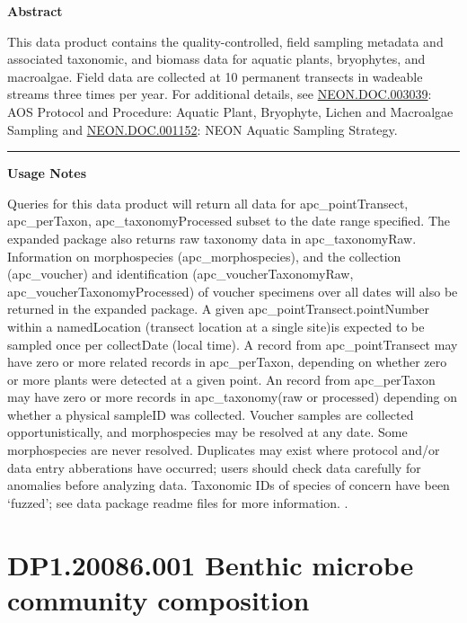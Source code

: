 \documentclass[]{article}
\begin{document}
\textbf{Abstract}

This data product contains the quality-controlled, field sampling
metadata and associated taxonomic, and biomass data for aquatic plants,
bryophytes, and macroalgae. Field data are collected at 10 permanent
transects in wadeable streams three times per year. For additional
details, see
\href{http://data.neonscience.org/api/v0/documents/NEON.DOC.003039vB}{NEON.DOC.003039}:
AOS Protocol and Procedure: Aquatic Plant, Bryophyte, Lichen and
Macroalgae Sampling and
\href{http://data.neonscience.org/api/v0/documents/NEON.DOC.001152vA}{NEON.DOC.001152}:
NEON Aquatic Sampling Strategy.

\begin{center}\rule{0.5\linewidth}{\linethickness}\end{center}

\textbf{Usage Notes}

Queries for this data product will return all data for
apc\_pointTransect, apc\_perTaxon, apc\_taxonomyProcessed subset to the
date range specified. The expanded package also returns raw taxonomy
data in apc\_taxonomyRaw. Information on morphospecies
(apc\_morphospecies), and the collection (apc\_voucher) and
identification (apc\_voucherTaxonomyRaw, apc\_voucherTaxonomyProcessed)
of voucher specimens over all dates will also be returned in the
expanded package. A given apc\_pointTransect.pointNumber within a
namedLocation (transect location at a single site)is expected to be
sampled once per collectDate (local time). A record from
apc\_pointTransect may have zero or more related records in
apc\_perTaxon, depending on whether zero or more plants were detected at
a given point. An record from apc\_perTaxon may have zero or more
records in apc\_taxonomy(raw or processed) depending on whether a
physical sampleID was collected. Voucher samples are collected
opportunistically, and morphospecies may be resolved at any date. Some
morphospecies are never resolved. Duplicates may exist where protocol
and/or data entry abberations have occurred; users should check data
carefully for anomalies before analyzing data. Taxonomic IDs of species
of concern have been `fuzzed'; see data package readme files for more
information. \newpage
.

\section{DP1.20086.001 Benthic microbe community
composition}\label{dp1.20086.001-benthic-microbe-community-composition}
\end{document}
